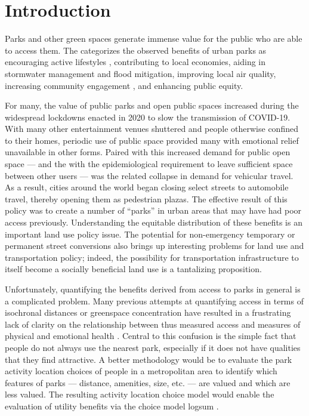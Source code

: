 \documentclass[3p, authoryear]{elsarticle} %
\begin{document}
\hypertarget{intro}{%
\section{Introduction}\label{intro}}

Parks and other green spaces generate immense value for the public who are able
to access them. The \citet{CityParksAlliance} categorizes the observed benefits of
urban parks as encouraging active lifestyles \citep{Bancroft2015}, contributing to
local economies, aiding in stormwater management and flood mitigation,
improving local air quality, increasing community engagement \citep{Madzia2018}, and
enhancing public equity.

For many, the value of public parks and open public spaces increased during the
widespread lockdowns enacted in 2020 to slow the transmission of COVID-19. With
many other entertainment venues shuttered and people otherwise confined to their
homes, periodic use of public space provided many with emotional relief
unavailable in other forms. Paired with this increased demand for public open
space --- and the with the epidemiological requirement to leave sufficient space
between other users --- was the related collapse in demand for vehicular travel.
As a result, cities around the world began closing select streets to automobile
travel, thereby opening them as pedestrian plazas. The effective result of this
policy was to create a number of ``parks'' in urban areas that may have had
poor access previously. Understanding the equitable distribution of these
benefits is an important land use policy issue. The potential for non-emergency
temporary or permanent street conversions also brings up interesting problems
for land use and transportation policy; indeed, the possibility for
transportation infrastructure to itself become a socially beneficial land use is
a tantalizing proposition.

Unfortunately, quantifying the benefits derived from access to parks in general
is a complicated problem. Many previous attempts at quantifying access in terms
of isochronal distances or greenspace concentration have resulted in a
frustrating lack of clarity on the relationship between thus measured access and
measures of physical and emotional health \citep{Bancroft2015}. Central to this
confusion is the simple fact that people do not always use the nearest park,
especially if it does not have qualities that they find attractive. A better
methodology would be to evaluate the park activity location choices of people in
a metropolitan area to identify which features of parks --- distance, amenities,
size, etc. --- are valued and which are less valued. The resulting activity
location choice model would enable the evaluation of utility benefits via the
choice model logsum \citep{Handy1997, DeJong2007}.
\end{document}
